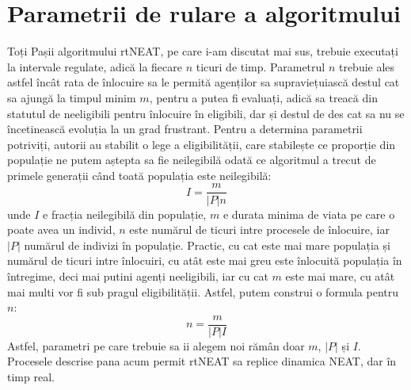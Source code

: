 \section{Parametrii de rulare a algoritmului}
Toți Pașii algoritmului rtNEAT, pe care i-am discutat mai sus, trebuie executați la intervale regulate, adică la fiecare $n$ ticuri de timp.
Parametrul $n$ trebuie ales astfel încât rata de înlocuire sa le permită agenților sa supraviețuiască destul cat sa ajungă la timpul minim $m$, pentru a putea fi evaluați, adică sa treacă din statutul de neeligibili pentru înlocuire în eligibili, dar și destul de des cat sa nu se încetinească evoluția la un grad frustrant.
Pentru a determina parametrii potriviți, autorii au stabilit o lege a eligibilității, care stabilește ce proporție din populație ne putem aștepta sa fie neilegibilă odată ce algoritmul a trecut de primele generații când toată populația este neilegibilă:
\begin{equation}\label{eq:Law Of Eligibility}
    I = \frac{m}{|P|n}
\end{equation}
unde $I$ e fracția neilegibilă din populație, $m$ e durata minima de viata pe care o poate avea un individ, $n$ este numărul de ticuri intre procesele de înlocuire, iar $|P|$ numărul de indivizi în populație.
Practic, cu cat este mai mare populația și numărul de ticuri intre înlocuiri, cu atât este mai greu este înlocuită populația în întregime, deci mai putini agenți neeligibili, iar cu cat $m$ este mai mare, cu atât mai multi vor fi sub pragul eligibilității.
Astfel, putem construi o formula pentru $n$:
\begin{equation}\label{eq:formula for n}
    n = \frac{m}{|P|I}
\end{equation}
Astfel, parametri pe care trebuie sa ii alegem noi rămân doar $m$, $|P|$ și $I$.
\\
Procesele descrise pana acum permit rtNEAT sa replice dinamica NEAT, dar în timp real.
